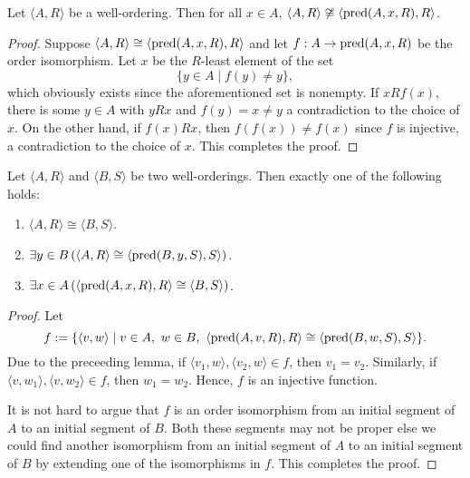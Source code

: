 \begin{lemma}
    Let $\langle A, R\rangle$ be a well-ordering. Then for all $x\in A$, $\langle A, R\rangle\not\cong\langle\operatorname{pred}(A,x,R), R\rangle$.
\end{lemma}
\begin{proof}
    Suppose $\langle A, R\rangle\cong\langle\operatorname{pred}(A,x,R), R\rangle$ and let $f: A\to \operatorname{pred}(A,x,R)$ be the order isomorphism. Let $x$ be the $R$-least element of the set 
    \begin{equation*}
        \{y\in A\mid f(y)\ne y\},
    \end{equation*}
    which obviously exists since the aforementioned set is nonempty. If $x R f(x)$, there is some $y\in A$ with $y R x$ and $f(y) = x\ne y$ a contradiction to the choice of $x$. On the other hand, if $f(x) R x$, then $f(f(x))\ne f(x)$ since $f$ is injective, a contradiction to the choice of $x$. This completes the proof.
\end{proof}

\begin{theorem}
    Let $\langle A, R\rangle$ and $\langle B, S\rangle$ be two well-orderings. Then exactly one of the following holds: 
    \begin{enumerate}[label=(\alph*)]
        \item $\langle A, R\rangle\cong\langle B, S\rangle$.
        \item $\exists y\in B\left(\langle A, R\rangle\cong\langle\operatorname{pred}(B,y,S), S\rangle\right)$.
        \item $\exists x\in A\left(\langle\operatorname{pred}(A,x,R), R\rangle\cong\langle B, S\rangle\right)$.
    \end{enumerate}
\end{theorem}
\begin{proof}
    Let 
    \begin{equation*}
        f := \{\langle v, w\rangle\mid v\in A,~w\in B,~\langle\operatorname{pred}(A,v,R), R\rangle\cong\langle\operatorname{pred}(B,w,S), S\rangle\}.
    \end{equation*}
    Due to the preceeding lemma, if $\langle v_1,w\rangle, \langle v_2,w\rangle\in f$, then $v_1 = v_2$. Similarly, if $\langle v,w_1\rangle, \langle v,w_2\rangle\in f$, then $w_1 = w_2$. Hence, $f$ is an injective function.

    It is not hard to argue that $f$ is an order isomorphism from an initial segment of $A$ to an initial segment of $B$. Both these segments may not be proper else we could find another isomorphism from an initial segment of $A$ to an initial segment of $B$ by extending one of the isomorphisms in $f$. This completes the proof.
\end{proof}